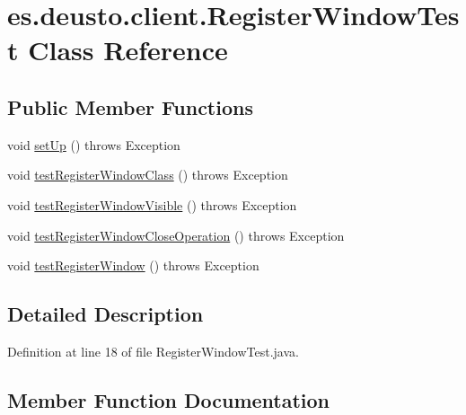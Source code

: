\hypertarget{classes_1_1deusto_1_1client_1_1_register_window_test}{}\section{es.\+deusto.\+client.\+Register\+Window\+Test Class Reference}
\label{classes_1_1deusto_1_1client_1_1_register_window_test}
\subsection*{Public Member Functions}
\begin{DoxyCompactItemize}
\item 
void \hyperlink{classes_1_1deusto_1_1client_1_1_register_window_test_a33450653f61309ce014424203298d7e1}{set\+Up} ()  throws Exception 
\item 
void \hyperlink{classes_1_1deusto_1_1client_1_1_register_window_test_aa855baa24326982f71b130ba029ac65e}{test\+Register\+Window\+Class} ()  throws Exception 
\item 
void \hyperlink{classes_1_1deusto_1_1client_1_1_register_window_test_a7aa05237597943e612504c032609486e}{test\+Register\+Window\+Visible} ()  throws Exception 
\item 
void \hyperlink{classes_1_1deusto_1_1client_1_1_register_window_test_acd9f26a04a5bc49f4366864e55df939d}{test\+Register\+Window\+Close\+Operation} ()  throws Exception 
\item 
void \hyperlink{classes_1_1deusto_1_1client_1_1_register_window_test_a23ef407d5629d1ecf6a4bdabc8a9a7f7}{test\+Register\+Window} ()  throws Exception 
\end{DoxyCompactItemize}


\subsection{Detailed Description}


Definition at line 18 of file Register\+Window\+Test.\+java.



\subsection{Member Function Documentation}
\mbox{\label{classes_1_1deusto_1_1client_1_1_register_window_test_a33450653f61309ce014424203298d7e1}} 

